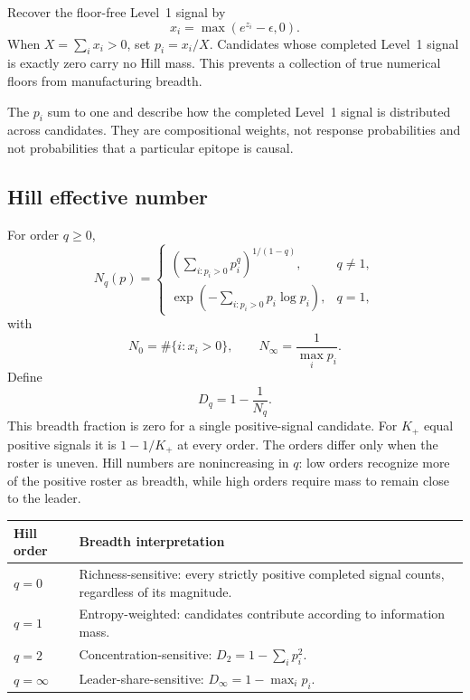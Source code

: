 \documentclass[11pt]{article}
\begin{document}
Recover the floor-free Level~1 signal by
\begin{equation}
x_i=\max(e^{z_i}-\epsilon,0).
\end{equation}
When $X=\sum_i x_i>0$, set $p_i=x_i/X$. Candidates whose completed Level~1
signal is exactly zero carry no Hill mass. This prevents a collection of true
numerical floors from manufacturing breadth.

The $p_i$ sum to one and describe how the completed Level~1 signal is
distributed across candidates. They are compositional weights, not response
probabilities and not probabilities that a particular epitope is causal.

\subsection{Hill effective number}

For order $q\geq0$,
\begin{equation}
N_q(p)=
\begin{cases}
\left(\sum_{i:p_i>0}p_i^q\right)^{1/(1-q)}, & q\neq1,\\[3pt]
\exp\left(-\sum_{i:p_i>0}p_i\log p_i\right), & q=1,
\end{cases}
\end{equation}
with
\[
N_0=\#\{i:x_i>0\},\qquad
N_\infty=\frac{1}{\max_i p_i}.
\]
Define
\begin{equation}
D_q=1-\frac{1}{N_q}.
\label{eq:breadth}
\end{equation}
This breadth fraction is zero for a single positive-signal candidate.
For $K_+$ equal positive signals it is $1-1/K_+$ at every order. The orders
differ only when the roster is uneven. Hill numbers are nonincreasing in $q$:
low orders recognize more of the positive roster as breadth, while high
orders require mass to remain close to the leader.

\begin{center}
\small
\begin{tabularx}{0.92\textwidth}{@{}p{}>{\raggedright\arraybackslash}X@{}}
\toprule
Hill order & Breadth interpretation \\
\midrule
$q=0$ & Richness-sensitive: every strictly positive completed signal counts,
regardless of its magnitude. \\
$q=1$ & Entropy-weighted: candidates contribute according to information
mass. \\
$q=2$ & Concentration-sensitive:
$D_2=1-\sum_i p_i^2$. \\
$q=\infty$ & Leader-share-sensitive:
$D_\infty=1-\max_i p_i$. \\
\bottomrule
\end{tabularx}
\end{center}
\end{document}

